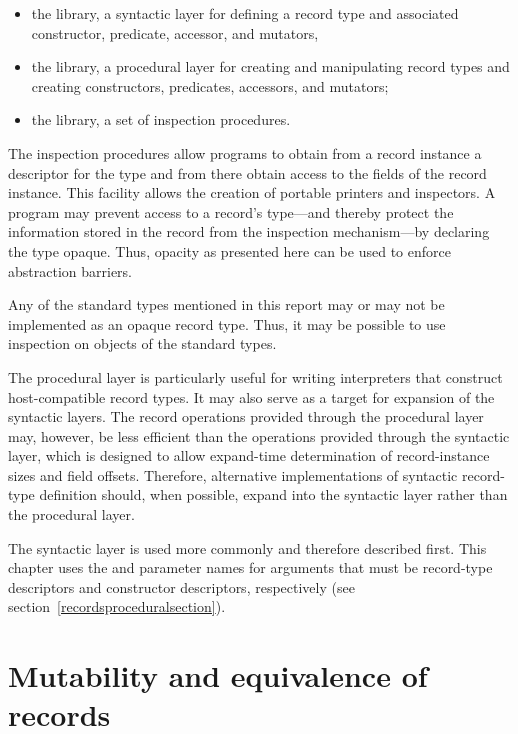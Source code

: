 \begin{itemize}
\item the  library,
  a syntactic layer for defining a record type and
  associated constructor, predicate, accessor, and mutators,
\item the  library,
  a procedural layer for creating and manipulating record types and creating
  constructors, predicates, accessors, and mutators;
\item the  library,
  a set of inspection procedures.
\end{itemize}
% 
The inspection procedures allow programs to obtain from a record
instance a descriptor for the type and from there obtain access to the
fields of the record instance. This facility allows the creation of
portable printers and inspectors.  A program may prevent access to a
record's type---and thereby protect the information stored in the
record from the inspection mechanism---by declaring the type opaque.
Thus, opacity as presented here can be used to enforce abstraction
barriers.

Any of the standard types mentioned in this report may or may not be
implemented as an opaque record type.  Thus, it may be possible to use
inspection on objects of the standard types.

The procedural layer is particularly useful for writing interpreters
that construct host-compatible record types.  It may also serve as a
target for expansion of the syntactic layers.  The
record operations provided through the procedural layer may, however, be
less efficient than the operations provided through the
syntactic layer, which is designed to allow expand-time determination
of record-instance sizes and field offsets.  Therefore, alternative implementations
of syntactic record-type definition should, when possible, expand into
the syntactic layer rather than the procedural layer.

The syntactic layer is used more commonly and therefore described
first.  This chapter uses the  and
 parameter names for arguments that must
be record-type descriptors and constructor descriptors, respectively
(see section~\ref{recordsproceduralsection}).


\section{Mutability and equivalence of records}
\label{recordsequivalencesection}

